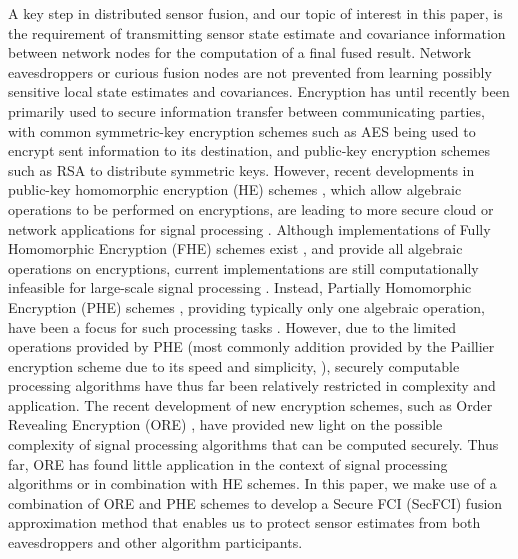 \documentclass[letterpaper, 10 pt, conference]{ieeeconf}  %
\begin{document}
A key step in distributed sensor fusion, and our topic of interest in this paper, is the requirement of transmitting sensor state estimate and covariance information between network nodes for the computation of a final fused result. Network eavesdroppers or curious fusion nodes are not prevented from learning possibly sensitive local state estimates and covariances. Encryption has until recently been primarily used to secure information transfer between communicating parties, with common symmetric-key encryption schemes such as AES \cite{AnnouncingAdvancedEncryption2001} being used to encrypt sent information to its destination, and public-key encryption schemes such as RSA \cite{rivestMethodObtainingDigital1978} to distribute symmetric keys. However, recent developments in public-key homomorphic encryption (HE) schemes \cite{gentryFullyHomomorphicEncryption2009,elgamalPublicKeyCryptosystem1985,paillierPublicKeyCryptosystemsBased1999}, which allow algebraic operations to be performed on encryptions, are leading to more secure cloud or network applications for signal processing \cite{lagendijkEncryptedSignalProcessing2013,alexandruEncryptedCooperativeControl,aristovEncryptedMultisensorInformation2018}. Although implementations of Fully Homomorphic Encryption (FHE) schemes exist \cite{gentryImplementingGentryFullyHomomorphic2011}, and provide all algebraic operations on encryptions, current implementations are still computationally infeasible for large-scale signal processing \cite{duImplementingMLAlgorithms,acarSurveyHomomorphicEncryption2018}. Instead, Partially Homomorphic Encryption (PHE) schemes \cite{elgamalPublicKeyCryptosystem1985,paillierPublicKeyCryptosystemsBased1999}, providing typically only one algebraic operation, have been a focus for such processing tasks \cite{alexandruEncryptedCooperativeControl,aristovEncryptedMultisensorInformation2018}. However, due to the limited operations provided by PHE (most commonly addition provided by the Paillier encryption scheme due to its speed and simplicity, \cite{paillierPublicKeyCryptosystemsBased1999}), securely computable processing algorithms have thus far been relatively restricted in complexity and application. The recent development of new encryption schemes, such as Order Revealing Encryption (ORE) \cite{chenettePracticalOrderRevealingEncryption2016,lewiOrderRevealingEncryptionNew2016,bogatovComparativeEvaluationOrderPreserving}, have provided new light on the possible complexity of signal processing algorithms that can be computed securely. Thus far, ORE has found little application in the context of signal processing algorithms or in combination with HE schemes. In this paper, we make use of a combination of ORE and PHE schemes to develop a Secure FCI (SecFCI) fusion approximation method that enables us to protect sensor estimates from both eavesdroppers and other algorithm participants.
\end{document}
